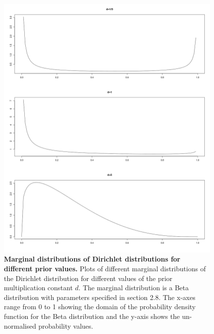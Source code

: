 \documentclass[11pt,a4paper]{report}
\begin{document}
\begin{figure}[h!]
\centering
\includegraphics[scale=0.51]{betaplot.png}
\caption{{\bf Marginal distributions of Dirichlet distributions for different prior values.} Plots of different marginal distributions of the Dirichlet distribution for different values of the prior multiplication constant $d$. The marginal distribution is a Beta distribution with parameters specified in section 2.8. The x-axes range from 0 to 1 showing the domain of the probability density function for the Beta distribution and the y-axis shows the un-normalised probability values.}
\end{figure}
\end{document}
